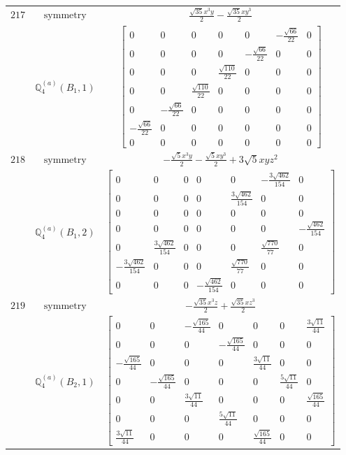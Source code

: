 \documentclass[fleqn,8pt,landscape]{jsarticle}
\begin{document}
\begin{longtable}{ccc}
$ 217 $ & $ \text{symmetry} $ & $ \frac{\sqrt{35} x^{3} y}{2} - \frac{\sqrt{35} x y^{3}}{2} $ \\
$  $ & $ \mathbb{Q}_{4}^{(a)}(B_{1},1) $ & $ \begin{bmatrix} 0 & 0 & 0 & 0 & 0 & - \frac{\sqrt{66}}{22} & 0 \\ 0 & 0 & 0 & 0 & - \frac{\sqrt{66}}{22} & 0 & 0 \\ 0 & 0 & 0 & \frac{\sqrt{110}}{22} & 0 & 0 & 0 \\ 0 & 0 & \frac{\sqrt{110}}{22} & 0 & 0 & 0 & 0 \\ 0 & - \frac{\sqrt{66}}{22} & 0 & 0 & 0 & 0 & 0 \\ - \frac{\sqrt{66}}{22} & 0 & 0 & 0 & 0 & 0 & 0 \\ 0 & 0 & 0 & 0 & 0 & 0 & 0 \end{bmatrix} $ \\ \hline
$ 218 $ & $ \text{symmetry} $ & $ - \frac{\sqrt{5} x^{3} y}{2} - \frac{\sqrt{5} x y^{3}}{2} + 3 \sqrt{5} x y z^{2} $ \\
$  $ & $ \mathbb{Q}_{4}^{(a)}(B_{1},2) $ & $ \begin{bmatrix} 0 & 0 & 0 & 0 & 0 & - \frac{3 \sqrt{462}}{154} & 0 \\ 0 & 0 & 0 & 0 & \frac{3 \sqrt{462}}{154} & 0 & 0 \\ 0 & 0 & 0 & 0 & 0 & 0 & 0 \\ 0 & 0 & 0 & 0 & 0 & 0 & - \frac{\sqrt{462}}{154} \\ 0 & \frac{3 \sqrt{462}}{154} & 0 & 0 & 0 & \frac{\sqrt{770}}{77} & 0 \\ - \frac{3 \sqrt{462}}{154} & 0 & 0 & 0 & \frac{\sqrt{770}}{77} & 0 & 0 \\ 0 & 0 & 0 & - \frac{\sqrt{462}}{154} & 0 & 0 & 0 \end{bmatrix} $ \\ \hline
$ 219 $ & $ \text{symmetry} $ & $ - \frac{\sqrt{35} x^{3} z}{2} + \frac{\sqrt{35} x z^{3}}{2} $ \\
$  $ & $ \mathbb{Q}_{4}^{(a)}(B_{2},1) $ & $ \begin{bmatrix} 0 & 0 & - \frac{\sqrt{165}}{44} & 0 & 0 & 0 & \frac{3 \sqrt{11}}{44} \\ 0 & 0 & 0 & - \frac{\sqrt{165}}{44} & 0 & 0 & 0 \\ - \frac{\sqrt{165}}{44} & 0 & 0 & 0 & \frac{3 \sqrt{11}}{44} & 0 & 0 \\ 0 & - \frac{\sqrt{165}}{44} & 0 & 0 & 0 & \frac{5 \sqrt{11}}{44} & 0 \\ 0 & 0 & \frac{3 \sqrt{11}}{44} & 0 & 0 & 0 & \frac{\sqrt{165}}{44} \\ 0 & 0 & 0 & \frac{5 \sqrt{11}}{44} & 0 & 0 & 0 \\ \frac{3 \sqrt{11}}{44} & 0 & 0 & 0 & \frac{\sqrt{165}}{44} & 0 & 0 \end{bmatrix} $ \\ \hline

\end{longtable}
\end{document}
